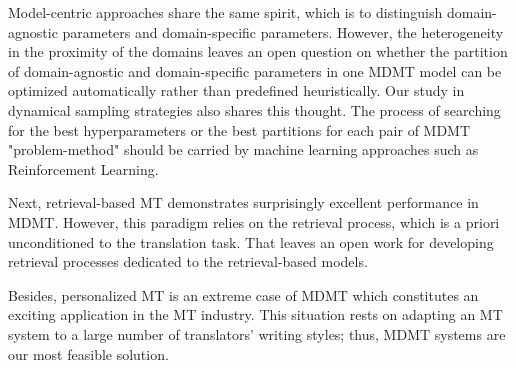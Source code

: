 Model-centric approaches share the same spirit, which is to distinguish domain-agnostic parameters and domain-specific parameters. However, the heterogeneity in the proximity of the domains leaves an open question on whether the partition of domain-agnostic and domain-specific parameters in one MDMT model can be optimized automatically rather than predefined heuristically. Our study in dynamical sampling strategies also shares this thought. The process of searching for the best hyperparameters or the best partitions for each pair of MDMT "problem-method" should be carried by machine learning approaches such as Reinforcement Learning.

Next, retrieval-based MT demonstrates surprisingly excellent performance in MDMT. However, this paradigm relies on the retrieval process, which is a priori unconditioned to the translation task. That leaves an open work for developing retrieval processes dedicated to the retrieval-based models.

Besides, personalized MT is an extreme case of MDMT \citep{Michel18extreme} which constitutes an exciting application in the MT industry. This situation rests on adapting an MT system to a large number of translators' writing styles; thus, MDMT systems are our most feasible solution.

